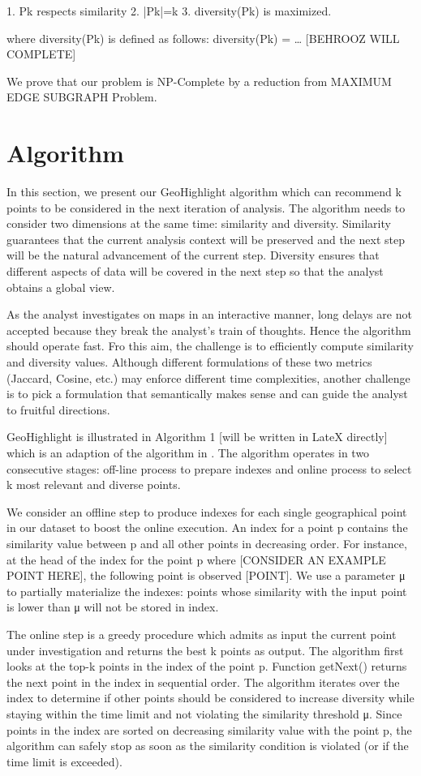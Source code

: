 \documentclass{sig-alternate-05-2015}
\begin{document}
1. Pk respects similarity
2. |Pk|=k
3. diversity(Pk) is maximized.

where diversity(Pk) is defined as follows: diversity(Pk) = … [BEHROOZ WILL COMPLETE]

We prove that our problem is NP-Complete by a reduction from MAXIMUM EDGE SUBGRAPH Problem.

\section{Algorithm}

In this section, we present our GeoHighlight algorithm which can recommend k points to be considered in the next iteration of analysis. The algorithm needs to consider two dimensions at the same time: similarity and diversity. Similarity guarantees that the current analysis context will be preserved and the next step will be the natural advancement of the current step. Diversity ensures that different aspects of data will be covered in the next step so that the analyst obtains a global view.

As the analyst investigates on maps in an interactive manner, long delays are not accepted because they break the analyst’s train of thoughts. Hence the algorithm should operate fast. Fro this aim, the challenge is to efficiently compute similarity and diversity values. Although different formulations of these two metrics (Jaccard, Cosine, etc.) may enforce different time complexities, another challenge is to pick a formulation that semantically makes sense and can guide the analyst to fruitful directions.

GeoHighlight is illustrated in Algorithm 1 [will be written in LateX directly] which is an adaption of the algorithm in \cite{Omidvar-Tehrani:2015}. The algorithm operates in two consecutive stages: off-line process to prepare indexes and online process to select k most relevant and diverse points.

We consider an offline step to produce indexes for each single geographical point in our dataset to boost the online execution. An index for a point p contains the similarity value between p and all other points in decreasing order. For instance, at the head of the index for the point p where [CONSIDER AN EXAMPLE POINT HERE], the following point is observed [POINT]. We use a parameter μ to partially materialize the indexes: points whose similarity with the input point is lower than μ will not be stored in index.

The online step is a greedy procedure which admits as input the current point under investigation and returns the best k points as output. The algorithm first looks at the top-k points in the index of the point p. Function getNext() returns the next point in the index in sequential order. The algorithm iterates over the index to determine if other points should be considered to increase diversity while staying within the time limit and not violating the similarity threshold μ. Since points in the index are sorted on decreasing similarity value with the point p, the algorithm can safely stop as soon as the similarity condition is violated (or if the time limit is exceeded).
\end{document}
